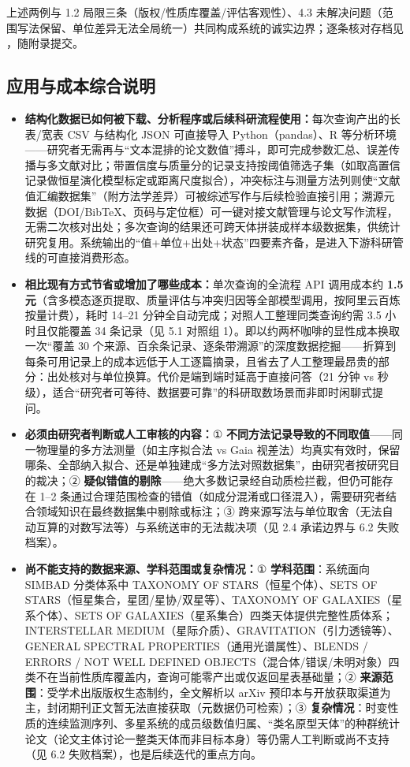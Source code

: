 \noindent 上述两例与 1.2 局限三条（版权/性质库覆盖/评估客观性）、4.3 未解决问题（范围写法保留、单位差异无法全局统一）共同构成系统的诚实边界；逐条核对存档见 ，随附录提交。

\subsection{应用与成本综合说明}

\begin{itemize}[leftmargin=1.2em,itemsep=3pt]
\item \textbf{结构化数据已如何被下载、分析程序或后续科研流程使用：}每次查询产出的长表/宽表 CSV 与结构化 JSON 可直接导入 Python（pandas）、R 等分析环境——研究者无需再与“文本混排的论文数值”搏斗，即可完成参数汇总、误差传播与多文献对比；带置信度与质量分的记录支持按阈值筛选子集（如取高置信记录做恒星演化模型标定或距离尺度拟合），冲突标注与测量方法列则使“文献值汇编数据集”（附方法学差异）可被综述写作与后续检验直接引用；溯源元数据（DOI/BibTeX、页码与定位框）可一键对接文献管理与论文写作流程，无需二次核对出处；多次查询的结果还可跨天体拼装成样本级数据集，供统计研究复用。系统输出的“值+单位+出处+状态”四要素齐备，是进入下游科研管线的可直接消费形态。
\item \textbf{相比现有方式节省或增加了哪些成本：}单次查询的全流程 API 调用成本约 \textbf{1.5 元}（含多模态逐页提取、质量评估与冲突归因等全部模型调用，按阿里云百炼按量计费），耗时 14--21 分钟全自动完成；对照人工整理同类查询约需 3.5 小时且仅能覆盖 34 条记录（见 5.1 对照组 1）。即以约两杯咖啡的显性成本换取一次“覆盖 30 个来源、百余条记录、逐条带溯源”的深度数据挖掘——折算到每条可用记录上的成本远低于人工逐篇摘录，且省去了人工整理最昂贵的部分：出处核对与单位换算。代价是端到端时延高于直接问答（21 分钟 vs 秒级），适合“研究者可等待、数据要可靠”的科研取数场景而非即时闲聊式提问。
\item \textbf{必须由研究者判断或人工审核的内容：}① \textbf{不同方法记录导致的不同取值}——同一物理量的多方法测量（如主序拟合法 vs Gaia 视差法）均真实有效时，保留哪条、全部纳入拟合、还是单独建成“多方法对照数据集”，由研究者按研究目的裁决；② \textbf{疑似错值的剔除}——绝大多数记录经自动质检拦截，但仍可能存在 1--2 条通过合理范围检查的错值（如成分混淆或口径混入），需要研究者结合领域知识在最终数据集中剔除或标注；③ 跨来源写法与单位取舍（无法自动互算的对数写法等）与系统送审的无法裁决项（见 2.4 承诺边界与 6.2 失败档案）。
\item \textbf{尚不能支持的数据来源、学科范围或复杂情况：}① \textbf{学科范围}：系统面向 SIMBAD 分类体系中 TAXONOMY OF STARS（恒星个体）、SETS OF STARS（恒星集合，星团/星协/双星等）、TAXONOMY OF GALAXIES（星系个体）、SETS OF GALAXIES（星系集合）四类天体提供完整性质体系；INTERSTELLAR MEDIUM（星际介质）、GRAVITATION（引力透镜等）、GENERAL SPECTRAL PROPERTIES（通用光谱属性）、BLENDS / ERRORS / NOT WELL DEFINED OBJECTS（混合体/错误/未明对象）四类不在当前性质库覆盖内，查询可能零产出或仅返回星表基础量；② \textbf{来源范围}：受学术出版版权生态制约，全文解析以 arXiv 预印本与开放获取渠道为主，封闭期刊正文暂无法直接获取（元数据仍可检索）；③ \textbf{复杂情况}：时变性质的连续监测序列、多星系统的成员级数值归属、“类名原型天体”的种群统计论文（论文主体讨论一整类天体而非目标本身）等仍需人工判断或尚不支持（见 6.2 失败档案），也是后续迭代的重点方向。
\end{itemize}

